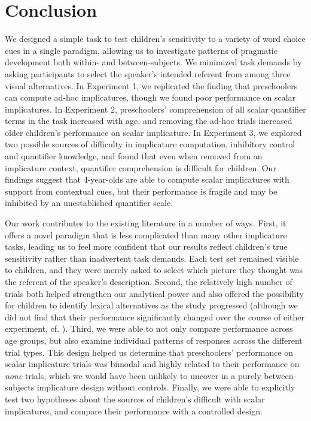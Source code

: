 \documentclass[man]{apa2}
\begin{document}
{\section{Conclusion}

We designed a simple task to test children's sensitivity to a variety of word choice cues in a single paradigm, allowing us to investigate patterns of pragmatic development both within- and between-subjects. We minimized task demands by asking participants to select the speaker's intended referent from among three visual alternatives. In Experiment 1, we replicated the finding that preschoolers can compute ad-hoc implicatures, though we found poor performance on scalar implicatures. In Experiment 2, preschoolers' comprehension of all scalar quantifier terms in the task increased with age, and removing the ad-hoc trials increased older children's performance on scalar implicature. In Experiment 3, we explored two possible sources of difficulty in implicature computation, inhibitory control and quantifier knowledge, and found that even when removed from an implicature context, quantifier comprehension is difficult for children.  Our findings suggest that 4-year-olds are able to compute scalar implicatures with support from contextual cues, but their performance is fragile and may be inhibited by an unestablished quantifier scale.

Our work contributes to the existing literature in a number of ways. First, it offers a novel paradigm that is less complicated than many other implicature tasks, leading us to feel more confident that our results reflect children's true sensitivity rather than inadvertent task demands. Each test set remained visible to children, and they were merely asked to select which picture they thought was the referent of the speaker's description. Second, the relatively high number of trials both helped strengthen our analytical power and also offered the possibility for children to identify lexical alternatives as the study progressed (although we did not find that their performance significantly changed over the course of either experiment, cf. ). Third, we were able to not only compare performance across age groups, but also examine individual patterns of responses across the different trial types. This design helped us determine that preschoolers' performance on scalar implicature trials was bimodal and highly related to their performance on \emph{none} trials, which we would have been unlikely to uncover in a purely between-subjects implicature design without controls. Finally, we were able to explicitly test two hypotheses about the sources of children's difficult with scalar implicatures, and compare their performance with a controlled design. 

}
\end{document}
